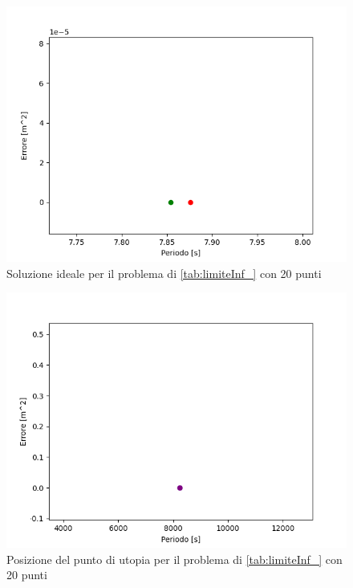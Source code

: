 \documentclass[a4paper,12pt]{report}
\begin{document}
\begin{figure}
  \center
  \includegraphics[scale=0.70]{img/puls08/soluzione_corretta.png}
  \caption{Soluzione ideale per il problema di \ref{tab:limiteInf_} con 20 punti}
  \label{fig:soluzione_ideale_08}
\end{figure}

\begin{figure}
  \center
  \includegraphics[scale=0.70]{img/puls08/posizione_utopia.png}
  \caption{Posizione del punto di utopia per il problema di \ref{tab:limiteInf_} con 20 punti}
  \label{fig:posizione_utopia_08}
\end{figure}
\end{document}
